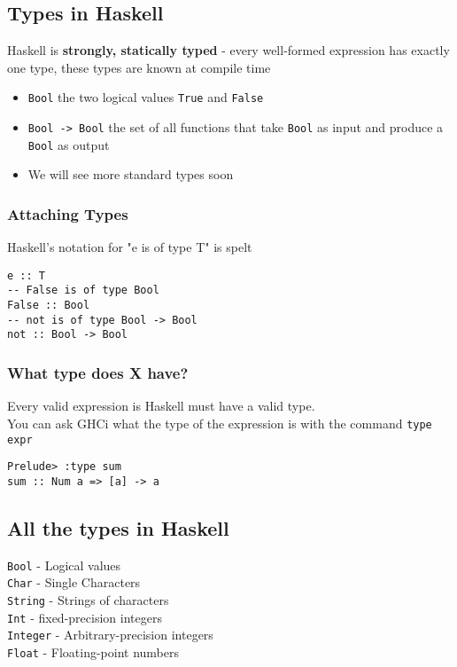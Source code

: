 \documentclass{article}[18pt]
\begin{document}
\subsection{Types in Haskell}
Haskell is \textbf{strongly, statically typed} - every well-formed expression has exactly one type, these types are known at compile time
\begin{itemize}
	\item \texttt{Bool} the two logical values \texttt{True} and \texttt{False}  
	\item \texttt{Bool -> Bool} the set of all functions that take \texttt{Bool} as input and produce a \texttt{Bool} as output
	\item We will see more standard types soon
\end{itemize}
\subsubsection{Attaching Types}
Haskell's notation for "e is of type T" is spelt
\begin{verbatim}
e :: T
-- False is of type Bool
False :: Bool
-- not is of type Bool -> Bool
not :: Bool -> Bool
\end{verbatim}
\subsubsection{What type does X have?}
Every valid expression is Haskell must have a valid type.\\
You can ask GHCi what the type of the expression is with the command \texttt{type expr}
\begin{verbatim}
Prelude> :type sum
sum :: Num a => [a] -> a
\end{verbatim}
\subsection{All the types in Haskell}
\texttt{Bool} - Logical values\\
\texttt{Char} - Single Characters\\
\texttt{String} - Strings of characters\\
\texttt{Int} - fixed-precision integers\\
\texttt{Integer} - Arbitrary-precision integers\\
\texttt{Float} - Floating-point numbers
\end{document}
